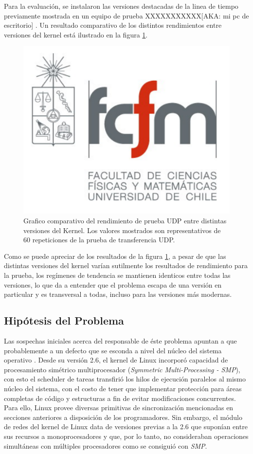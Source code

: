 Para la evaluación, se instalaron las versiones destacadas de la linea de tiempo previamente mostrada en un equipo de prueba XXXXXXXXXXX[AKA: mi pc de escritorio] . Un resultado comparativo de los distintos rendimientos entre versiones del kernel está ilustrado en la figura \ref{fig:tests_kernel}.

\begin{figure}[h!]
	\centering
	\includegraphics[scale=0.3]{imagenes/fcfm}
	\caption{Grafico comparativo del rendimiento de prueba UDP entre distintas versiones del Kernel. Los valores mostrados son representativos de 60 repeticiones de la prueba de transferencia UDP.}
	\label{fig:tests_kernel}
\end{figure}

Como se puede apreciar de los resultados de la figura \ref{fig:tests_kernel}, a pesar de que las distintas versiones del kernel varían sutilmente los resultados de rendimiento para la prueba, los regímenes de tendencia se mantienen identicos entre todas las versiones, lo que da a entender que el problema escapa de una versión en particular y es transversal a todas, incluso para las versiones más modernas.

\subsection{Hipótesis del Problema}
Las sospechas iniciales acerca del responsable de éste problema apuntan a que probablemente a un defecto que se esconda a nivel del núcleo del sistema operativo \cite{paper:toshiba,post:facebook}. Desde su versión 2.6, el kernel de Linux incorporó capacidad de procesamiento simétrico multiprocesador (\emph{Symmetric Multi-Processing - SMP}), con esto el scheduler de tareas transfirió los hilos de ejecución paralelos al mismo núcleo del sistema, con el costo de tener que implementar protección para áreas completas de código y estructuras a fin de evitar modificaciones concurrentes. Para ello, Linux provee diversas primitivas de sincronización mencionadas en secciones anteriores a disposición de los programadores. Sin embargo, el módulo de redes del kernel de Linux data de versiones previas a la 2.6 que suponían entre sus recursos a monoprocesadores y que, por lo tanto, no consideraban operaciones simultáneas con múltiples procesadores como se consiguió con \emph{SMP}.

